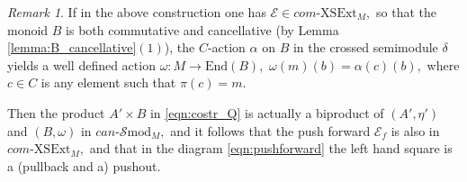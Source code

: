 \documentclass[a4paper]{amsart}
\theoremstyle{plain}
\theoremstyle{definition}
\theoremstyle{remark}
\newtheorem{remark}[subsection]{Remark}
\begin{document}
\begin{remark}
If in the above construction one has $\mathcal{E}\in com\text{-}\mathrm{XSExt}_M,$ so that the monoid $B$ is both commutative and cancellative (by Lemma \ref{lemma:B_cancellative}$(1)$), the $C$-action $\alpha$ on $B$ in the crossed semimodule $\delta$ yields a well defined action $\omega\colon M\longrightarrow\mathrm{End}(B),$ $\omega(m)(b)=\alpha(c)(b),$ where $c\in C$ is any element such that $\pi(c)=m.$

Then the product $A'\times B$ in \eqref{eqn:costr_Q} is actually a biproduct of $(A',\eta')$ and $(B,\omega)$ in $can\text{-}\mathcal{S}\mathrm{mod}_M,$ and it follows that the push forward $\mathcal{E}_f$ is also in $ com\text{-}\mathrm{XSExt}_M,$ and that in the diagram \eqref{eqn:pushforward} the left hand square is a (pullback and a) pushout.
\end{remark}
\end{document}

